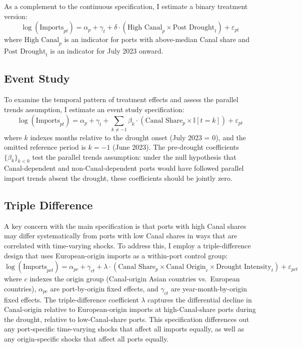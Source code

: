 \documentclass[12pt]{article}
\newcommand{\ind}{\mathbb{I}}
\begin{document}
As a complement to the continuous specification, I estimate a binary treatment version:
\begin{equation}
    \log(\text{Imports}_{pt}) = \alpha_p + \gamma_t + \delta \cdot (\text{High Canal}_p \times \text{Post Drought}_t) + \varepsilon_{pt}
\label{eq:binary}
\end{equation}
where $\text{High Canal}_p$ is an indicator for ports with above-median Canal share and $\text{Post Drought}_t$ is an indicator for July 2023 onward.

\subsection{Event Study}

To examine the temporal pattern of treatment effects and assess the parallel trends assumption, I estimate an event study specification:
\begin{equation}
    \log(\text{Imports}_{pt}) = \alpha_p + \gamma_t + \sum_{k \neq -1} \beta_k \cdot (\text{Canal Share}_p \times \ind[t = k]) + \varepsilon_{pt}
\label{eq:event}
\end{equation}
where $k$ indexes months relative to the drought onset (July 2023 = 0), and the omitted reference period is $k = -1$ (June 2023). The pre-drought coefficients $\{\beta_k\}_{k < 0}$ test the parallel trends assumption: under the null hypothesis that Canal-dependent and non-Canal-dependent ports would have followed parallel import trends absent the drought, these coefficients should be jointly zero.

\subsection{Triple Difference}

A key concern with the main specification is that ports with high Canal shares may differ systematically from ports with low Canal shares in ways that are correlated with time-varying shocks. To address this, I employ a triple-difference design that uses European-origin imports as a within-port control group:
\begin{equation}
    \log(\text{Imports}_{pct}) = \alpha_{pc} + \gamma_{ct} + \lambda \cdot (\text{Canal Share}_p \times \text{Canal Origin}_c \times \text{Drought Intensity}_t) + \varepsilon_{pct}
\label{eq:triple}
\end{equation}
where $c$ indexes the origin group (Canal-origin Asian countries vs.\ European countries), $\alpha_{pc}$ are port-by-origin fixed effects, and $\gamma_{ct}$ are year-month-by-origin fixed effects. The triple-difference coefficient $\lambda$ captures the differential decline in Canal-origin relative to European-origin imports at high-Canal-share ports during the drought, relative to low-Canal-share ports. This specification differences out any port-specific time-varying shocks that affect all imports equally, as well as any origin-specific shocks that affect all ports equally.
\end{document}
